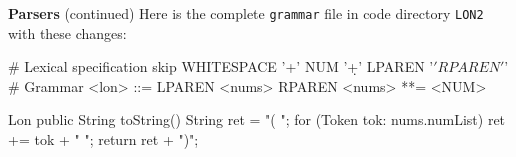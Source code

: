 \begin{minipage}[t]{\sw}
\slidenumber
\LARGE
{\bf Parsers} (continued)\exx
Here is the complete \verb'grammar' file
in code directory \verb'LON2' with these changes:
\Large
\begin{qv}
# Lexical specification
skip WHITESPACE '\s+'
NUM '\d+'
LPAREN '\('
RPAREN '\)'
%
# Grammar
<lon>  ::= LPAREN <nums> RPAREN
<nums> **= <NUM>
%

Lon
    public String toString() {
        String ret = "( ";
        for (Token tok: nums.numList) {
            ret += tok + " ";
        }
        return ret + ")";
    }
\end{qv}
\end{minipage}
\clearpage
